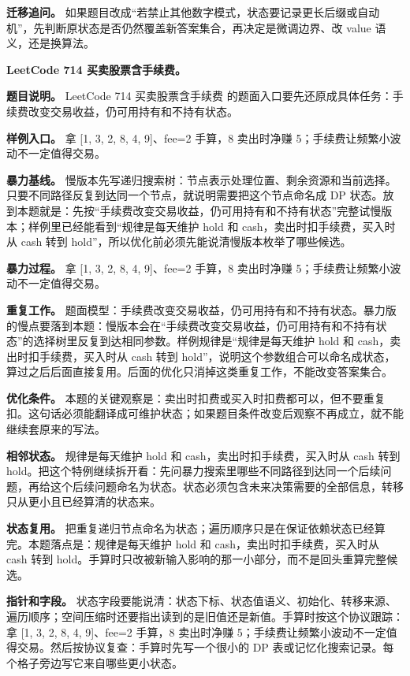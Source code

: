 \textbf{迁移追问。} 如果题目改成“若禁止其他数字模式，状态要记录更长后缀或自动机”，先判断原状态是否仍然覆盖新答案集合，再决定是微调边界、改 value 语义，还是换算法。

\noindent\textbf{LeetCode 714 买卖股票含手续费。}

\textbf{题目说明。} LeetCode 714 买卖股票含手续费 的题面入口要先还原成具体任务：手续费改变交易收益，仍可用持有和不持有状态。

\textbf{样例入口。} 拿 [1, 3, 2, 8, 4, 9]、fee=2 手算，8 卖出时净赚 5；手续费让频繁小波动不一定值得交易。

\textbf{暴力基线。} 慢版本先写递归搜索树：节点表示处理位置、剩余资源和当前选择。只要不同路径反复到达同一个节点，就说明需要把这个节点命名成 DP 状态。放到本题就是：先按“手续费改变交易收益，仍可用持有和不持有状态”完整试慢版本；样例里已经能看到“规律是每天维护 hold 和 cash，卖出时扣手续费，买入时从 cash 转到 hold”，所以优化前必须先能说清慢版本枚举了哪些候选。

\textbf{暴力过程。} 拿 [1, 3, 2, 8, 4, 9]、fee=2 手算，8 卖出时净赚 5；手续费让频繁小波动不一定值得交易。

\textbf{重复工作。} 题面模型：手续费改变交易收益，仍可用持有和不持有状态。暴力版的慢点要落到本题：慢版本会在“手续费改变交易收益，仍可用持有和不持有状态”的选择树里反复到达相同参数。样例规律是“规律是每天维护 hold 和 cash，卖出时扣手续费，买入时从 cash 转到 hold”，说明这个参数组合可以命名成状态，算过之后后面直接复用。后面的优化只消掉这类重复工作，不能改变答案集合。

\textbf{优化条件。} 本题的关键观察是：卖出时扣费或买入时扣费都可以，但不要重复扣。这句话必须能翻译成可维护状态；如果题目条件改变后观察不再成立，就不能继续套原来的写法。

\textbf{相邻状态。} 规律是每天维护 hold 和 cash，卖出时扣手续费，买入时从 cash 转到 hold。把这个特例继续拆开看：先问暴力搜索里哪些不同路径到达同一个后续问题，再给这个后续问题命名为状态。状态必须包含未来决策需要的全部信息，转移只从更小且已经算清的状态来。

\textbf{状态复用。} 把重复递归节点命名为状态；遍历顺序只是在保证依赖状态已经算完。本题落点是：规律是每天维护 hold 和 cash，卖出时扣手续费，买入时从 cash 转到 hold。手算时只改被新输入影响的那一小部分，而不是回头重算完整候选。

\textbf{指针和字段。} 状态字段要能说清：状态下标、状态值语义、初始化、转移来源、遍历顺序；空间压缩时还要指出读到的是旧值还是新值。手算时按这个协议跟踪：拿 [1, 3, 2, 8, 4, 9]、fee=2 手算，8 卖出时净赚 5；手续费让频繁小波动不一定值得交易。然后按协议复查：手算时先写一个很小的 DP 表或记忆化搜索记录。每个格子旁边写它来自哪些更小状态。

